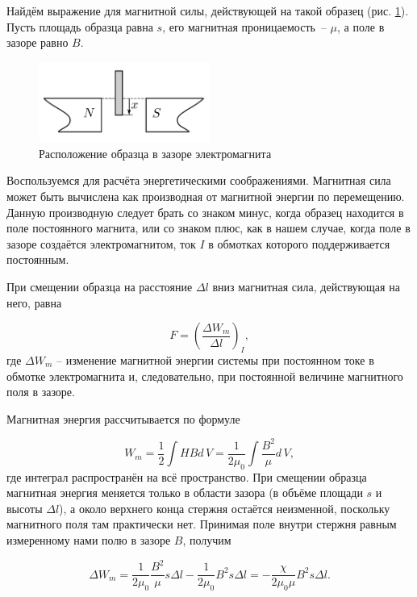 \documentclass[a4paper,12pt]{article} %
\begin{document}
Найдём выражение для магнитной силы, действующей на такой образец (рис. \ref{pic:2}). Пусть площадь образца равна $ s $, его магнитная проницаемость~-- $ \mu $, а поле в зазоре равно $ B $.

\begin{figure}[h]
\centering
    \includegraphics[width=0.5\textwidth]{2.png}
    \caption{Расположение образца в зазоре электромагнита}
    \label{pic:2}
\end{figure}

Воспользуемся для расчёта энергетическими соображениями. Магнитная сила может быть вычислена как производная от магнитной энергии по перемещению. Данную производную следует брать со знаком минус, когда образец находится в поле постоянного магнита, или со знаком плюс, как в нашем случае, когда поле в зазоре создаётся электромагнитом, ток $ I $ в обмотках которого поддерживается постоянным.

При смещении образца на расстояние $ \Delta l $ вниз магнитная сила, действующая на него, равна

\begin{equation}\label{1}
F = \left(\frac{\Delta W_m}{\Delta l}\right)_I,
\end{equation}
где $ \Delta W_m $ -- изменение магнитной энергии системы при постоянном токе
в обмотке электромагнита и, следовательно, при постоянной величине
магнитного поля в зазоре.

Магнитная энергия рассчитывается по формуле

\begin{equation}\label{2}
W_m=\frac{1}{2}\int HBd\,V = \frac{1}{2\mu_0}\int\frac{B^2}{\mu}d\,V,
\end{equation}
где интеграл распространён на всё пространство. При смещении образца магнитная энергия меняется только в области зазора (в объёме площади $ s $ и высоты $ \Delta l $), а около верхнего конца стержня остаётся неизменной, поскольку магнитного поля там практически нет. Принимая поле внутри стержня равным измеренному нами полю в зазоре $ B $, получим

\begin{equation}\label{3}
\Delta W_m=\frac{1}{2\mu_0}\frac{B^2}{\mu}s\Delta l - \frac{1}{2\mu_0}B^2 s\Delta l = -\frac{\chi}{2\mu_0\mu}B^2s\Delta l.
\end{equation}
\end{document}
